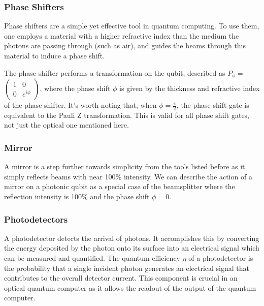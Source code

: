 \subsubsection{Phase Shifters}
Phase shifters are a simple yet effective tool in quantum computing. To use them, one employs a material with a higher refractive index than the medium the photons are passing through (such as air), and guides the beams through this material to induce a phase shift. 

The phase shifter performs a transformation on the qubit, described as $P_\phi = $ $\begin{pmatrix}
1 & 0 \\
0 & e^{i\phi}
\end{pmatrix}$, where the phase shift $\phi$ is given by the thickness and refractive index of the phase shifter. It's worth noting that, when $\phi = \frac{\pi}{2}$, the phase shift gate is equivalent to the Pauli Z transformation. This is valid for all phase shift gates, not just the optical one mentioned here.

\subsubsection{Mirror}
A mirror is a step further towards simplicity from the tools listed before as it simply reflects beams with near 100\% intensity. We can describe the action of a mirror on a photonic qubit as a special case of the beamsplitter where the reflection intensity is 100\% and the phase shift $\phi = 0$.

\subsubsection{Photodetectors}
A photodetector detects the arrival of photons. It accomplishes this by converting the energy deposited by the photon onto its surface into an electrical signal which can be measured and quantified. The quantum efficiency $\eta$ of a photodetector is the probability that a single incident photon generates an electrical signal that contributes to the overall detector current. This component is crucial in an optical quantum computer as it allows the readout of the output of the quantum computer. 


